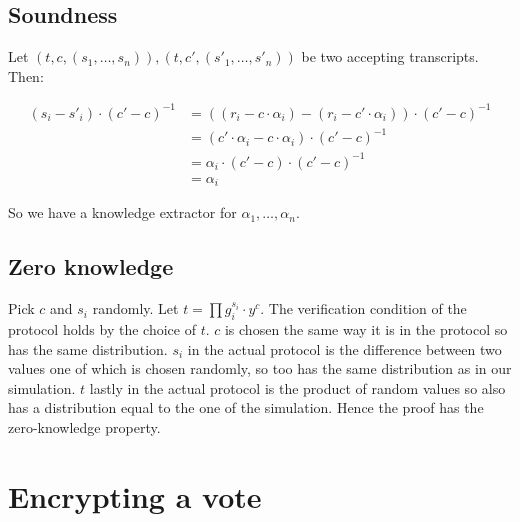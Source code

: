 \documentclass[a4paper]{scrreprt}
\begin{document}
\subsection{Soundness}

Let $(t, c, (s_1, \ldots, s_n)), (t, c', (s'_1, \ldots, s'_n))$ be two accepting
transcripts. Then:

\begin{align*}
		(s_i - s'_i) \cdot (c' - c)^{-1} & = ((r_i - c \cdot \alpha_i) - (r_i - c' \cdot \alpha_i)) \cdot (c' - c)^{-1} \\
										 & = (c' \cdot \alpha_i - c \cdot \alpha_i) \cdot (c' - c)^{-1} \\
										 & = \alpha_i \cdot (c' - c) \cdot (c' - c)^{-1} \\
										 & = \alpha_i
\end{align*}

So we have a knowledge extractor for $\alpha_1, \ldots, \alpha_n$.

\subsection{Zero knowledge}

Pick $c$ and $s_i$ randomly. Let $t = \prod g_i^{s_i} \cdot y^c$. The
verification condition of the protocol holds by the choice of $t$. $c$ is
chosen the same way it is in the protocol so has the same distribution. $s_i$
in the actual protocol is the difference between two values one of which is
chosen randomly, so too has the same distribution as in our simulation. $t$
lastly in the actual protocol is the product of random values so also has a
distribution equal to the one of the simulation. Hence the proof has the
zero-knowledge property.

\section{Encrypting a vote}
\end{document}

